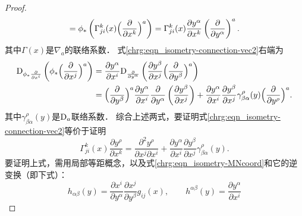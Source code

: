\begin{proof}
\begin{equation*}
        =\phi_{*}\left( \Gamma^{k}_{ji}(x) \Bigl(\frac{\partial} {\partial x^k}\Bigr)^a\right)
        =\Gamma^{k}_{ji}(x) \frac{\partial y^\alpha}{\partial x^k}
         \left( \frac{\partial }{\partial y^\alpha}\right)^a .
    \end{equation*}
    其中$\Gamma(x)$是$\nabla_a$的联络系数．
    式\eqref{chrg:eqn_isometry-connection-vec2}右端为
    \begin{align*}
        {\rm D}_ {\phi_* \frac{\partial}{\partial x^i}} \left({\phi_*}\Bigl(\frac{\partial}
        {\partial x^j}\Bigr)^a \right) &= \frac{\partial y^\alpha}{\partial x^i}
         {\rm D}_{\frac{\partial}{\partial y^\alpha}}
         \left( \frac{\partial y^\beta}{\partial x^j}
          \Bigl(\frac{\partial}{\partial y^\beta}\Bigr)^a\right)\\
        &=\Bigl(\frac{\partial}{\partial y^\beta}\Bigr)^a
        \frac{\partial y^\alpha}{\partial x^i} {\frac{\partial}{\partial y^\alpha}}
        \left( \frac{\partial y^\beta}{\partial x^j} \right) +
        \frac{\partial y^\alpha}{\partial x^i} \frac{\partial y^\beta}{\partial x^j}
        \gamma^{\rho}_{\beta\alpha}(y) \Bigl(\frac{\partial}{\partial y^\rho}\Bigr)^a .
    \end{align*}
    其中$\gamma^{\rho}_{\beta\alpha}(y)$是${\rm D}_a$联络系数．
    综合上述两式，要证明式\eqref{chrg:eqn_isometry-connection-vec2}等价于证明
    \begin{equation}\label{chrg:eqn_isometry-connection-tmp}
       \Gamma^{k}_{ji}(x) \frac{\partial y^\rho}{\partial x^k} =
         \frac{\partial^2 y^\rho}{\partial x^j \partial x^i}+
         \frac{\partial y^\alpha}{\partial x^i}
         \frac{\partial y^\beta}{\partial x^j}
         \gamma^{\rho}_{\beta\alpha}(y) .
    \end{equation}
    要证明上式，需用局部等距概念，以及式\eqref{chrg:eqn_isometry-MNcoord}和它的逆变换（即下式）：
    \begin{equation}
       h_{\alpha\beta}(y) =\frac{\partial x^i}{\partial y^\alpha}
        \frac{\partial x^j}{\partial y^\beta} g_{ij}(x), \qquad
       h^{\alpha\beta}(y)=\frac{\partial y^\alpha}{\partial x^i}

\end{equation}
\end{proof}
